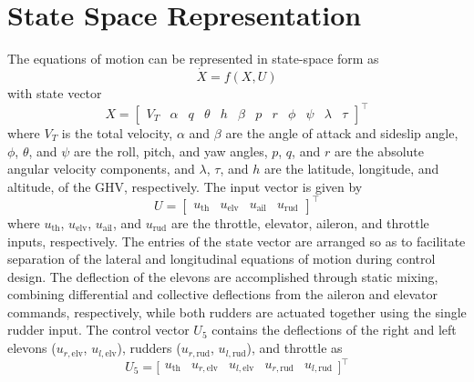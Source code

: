 \section{State Space Representation}

The equations of motion can be represented in state-space form as
\begin{equation}
  \dot{X}=f({X},U)
\end{equation}
with state vector
\begin{equation}
  \label{eqn:fullstatevectorx}
  X=\left[
  \begin{array}{cccccccccccc}
    V_{T} &  \alpha & q &\theta & h & \beta &p & r & \phi &\psi &\lambda & \tau
  \end{array}\right]^{\top}
\end{equation}
where $V_{T}$ is the total velocity, $\alpha$ and $\beta$ are the angle of attack and sideslip angle, $\phi$, $\theta$, and $\psi$ are the roll, pitch, and yaw angles, $p$, $q$, and $r$ are the absolute angular velocity components, and $\lambda$, $\tau$, and $h$ are the latitude, longitude, and altitude, of the GHV, respectively.
The input vector is given by
\begin{equation}
  \label{eqn:fullcontrolvector}
  U=\left[
  \begin{array}{cccc}
    u_{\text{th}} & u_{\text{elv}} & u_{\text{ail}} & u_{\text{rud}}
  \end{array}\right]^{\top}
\end{equation}
where $u_{\text{th}}$, $u_{\text{elv}}$, $u_{\text{ail}}$, and $u_{\text{rud}}$ are the throttle, elevator, aileron, and throttle inputs, respectively.
The entries of the state vector are arranged so as to facilitate separation of the lateral and longitudinal equations of motion during control design.
The deflection of the elevons are accomplished through static mixing, combining differential and collective deflections from the aileron and elevator commands, respectively, while both rudders are actuated together using the single rudder input.
The control vector $U_{5}$ contains the deflections of the right and left elevons ($u_{r,\text{elv}}$, $u_{l,\text{elv}}$), rudders ($u_{r,\text{rud}}$, $u_{l,\text{rud}}$), and throttle as
\begin{equation}
  U_{5}=
  \bigr[
  \begin{array}{ccccc}
    u_{\text{th}} & u_{r,\text{elv}} & u_{l,\text{elv}} & u_{r,\text{rud}}  & u_{l,\text{rud}}
  \end{array}\bigr]^{\top}
\end{equation}

